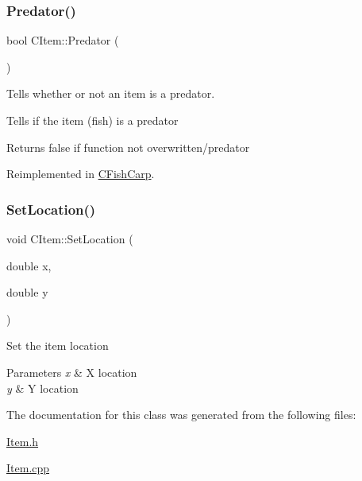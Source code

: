 \mbox{\label{class_c_item_af4f25e99aaf4b27ed6bdc5ff70b75c11}} 
\subsubsection{\texorpdfstring{Predator()}{Predator()}}
{\footnotesize\ttfamily bool C\+Item\+::\+Predator (\begin{DoxyParamCaption}{ }\end{DoxyParamCaption})\hspace{0.3cm}{\ttfamily [virtual]}}



Tells whether or not an item is a predator. 

Tells if the item (fish) is a predator \begin{DoxyReturn}{Returns}
false if function not overwritten/predator 
\end{DoxyReturn}


Reimplemented in \hyperlink{class_c_fish_carp_a16a7a5c00b88e1f2ab3fd2db928bd5aa}{C\+Fish\+Carp}.

\mbox{\label{class_c_item_a9c194f3f08e515853600cecca3e6d319}} 
\subsubsection{\texorpdfstring{Set\+Location()}{SetLocation()}}
{\footnotesize\ttfamily void C\+Item\+::\+Set\+Location (\begin{DoxyParamCaption}\item[{double}]{x,  }\item[{double}]{y }\end{DoxyParamCaption})\hspace{0.3cm}{\ttfamily [inline]}}

Set the item location 
\begin{DoxyParams}{Parameters}
{\em x} & X location \\
\hline
{\em y} & Y location \\
\hline
\end{DoxyParams}


The documentation for this class was generated from the following files\+:\begin{DoxyCompactItemize}
\item 
\hyperlink{_item_8h}{Item.\+h}\item 
\hyperlink{_item_8cpp}{Item.\+cpp}\end{DoxyCompactItemize}
